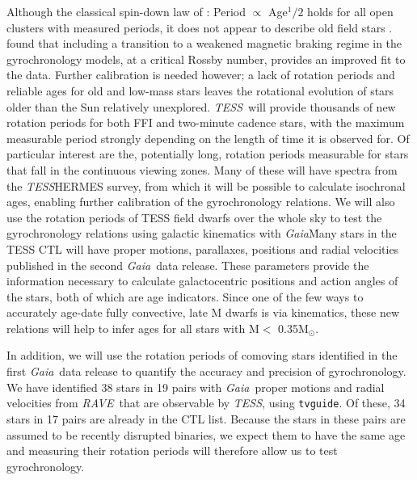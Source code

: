 \documentclass[useAMS, usenatbib, preprint, 12pt]{aastex}
\newcommand{\Kepler}{{\it Kepler}}
\newcommand{\kepler}{\Kepler}
\newcommand{\TESS}{{\it TESS}}
\newcommand{\Gaia}{{\it Gaia}}
\newcommand{\RAVE}{{\it RAVE}}
\begin{document}
Although the classical spin-down law of \citet{skumanich1972}: Period
$\propto$ Age$^1/2$ holds for all open clusters with measured periods, it does
not appear to describe old field stars \citep{angus2015, van-saders2016}.
\citet{van-saders2016} found that including a transition to a weakened magnetic
braking regime in the gyrochronology models, at a critical Rossby number,
provides an improved fit to the data.
Further calibration is needed however; a lack of rotation periods and reliable
ages for old and low-mass stars leaves the rotational evolution of stars older
than the Sun relatively unexplored.
\TESS\ will provide thousands of new rotation periods for both FFI and
two-minute cadence stars, with the maximum measurable period strongly
depending on the length of time it is observed for.
Of particular interest are the, potentially long, rotation periods measurable
for stars that fall in the continuous viewing zones.
Many of these will have spectra from the \TESS\/HERMES survey, from which it
will be possible to calculate isochronal ages, enabling further calibration of
the gyrochronology relations.
We will also use the rotation periods of TESS field dwarfs over the whole sky
to test the gyrochronology relations using galactic kinematics with \Gaia\.
Many stars in the TESS CTL will have proper motions, parallaxes, positions and
radial velocities published in the second \Gaia\ data release.
These parameters provide the information necessary to calculate galactocentric
positions and action angles of the stars, both of which are age indicators.
Since one of the few ways to accurately age-date fully convective, late M
dwarfs is via kinematics, these new relations will help to infer ages for all
stars with M$<$ 0.35M$_\odot$.

In addition, we will use the rotation periods of comoving stars identified in
the first \Gaia\ data release \citep{oh2017} to quantify the accuracy and
precision of gyrochronology.
We have identified 38 stars in 19 pairs with \Gaia\ proper motions and radial
velocities from \RAVE\ that are observable by \TESS, using {\tt tvguide}.
Of these, 34 stars in 17 pairs are already in the CTL list.
Because the stars in these pairs are assumed to be recently disrupted
binaries, we expect them to have the same age and measuring their rotation
periods will therefore allow us to test gyrochronology.
\end{document}

